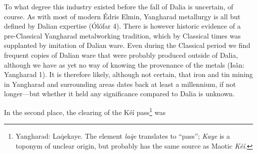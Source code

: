 \documentclass{article}
\begin{document}
{To what degree this industry existed before the fall of Dalia is uncertain, of course. As with most of modern Édris Elmin, Yangharad metallurgy is all but defined by Dalian expertise (Ólófar 4). There is however historic evidence of a pre-Classical Yangharad metalworking tradition, which by Classical times was supplanted by imitation of Dalian ware. Even during the Classical period we find frequent copies of Dalian ware that were probably produced outside of Dalia, although we have as yet no way of knowing the provenance of the metals (Isân: Yangharad 1). It is therefore likely, although not certain, that iron and tin mining in Yangharad and surrounding areas dates back at least a millennium, if not longer---but whether it held any significance compared to Dalia is unknown.

In the second place, the clearing of the Kéí pass\footnote{Yangharad: La\.{q}ekaye. The element \textit{la\.{q}e} translates to ``pass''; \textit{Kaye} is a toponym of unclear origin, but probably has the same source as Maotic \textit{Kéí}.} was

}
\end{document}
